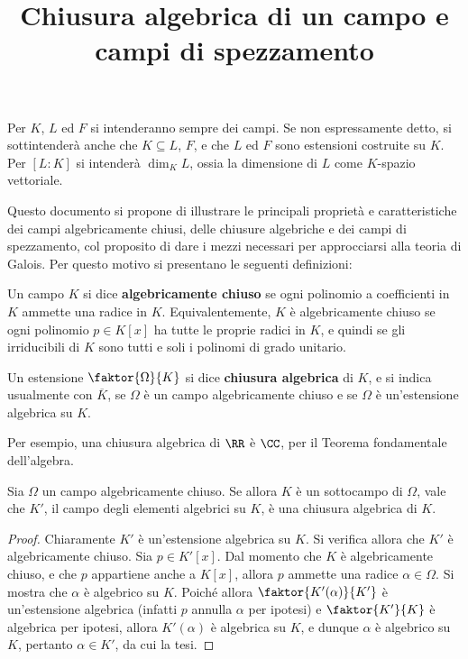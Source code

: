\documentclass[12pt]{scrartcl}
\begin{document}
	\title{Chiusura algebrica di un campo e campi di spezzamento}
	\maketitle
	
	\begin{note}
		Per $K$, $L$ ed $F$ si intenderanno sempre dei campi.
		Se non espressamente detto, si sottintenderà anche
		che $K \subseteq L$, $F$, e che $L$ ed $F$ sono
		estensioni costruite su $K$. Per $[L : K]$ si
		intenderà $\dim_K L$, ossia la dimensione di $L$
		come $K$-spazio vettoriale.
	\end{note} \bigskip


	Questo documento si propone di illustrare le principali
	proprietà e caratteristiche dei campi algebricamente
	chiusi, delle chiusure algebriche e dei campi di
	spezzamento, col proposito di dare i mezzi necessari
	per approcciarsi alla teoria di Galois. Per questo
	motivo si presentano le seguenti definizioni:
	
	\begin{definition}
		Un campo $K$ si dice \textbf{algebricamente chiuso}
		se ogni polinomio a coefficienti in $K$ ammette una
		radice in $K$. Equivalentemente, $K$ è algebricamente
		chiuso se ogni polinomio $p \in K[x]$ ha tutte le proprie
		radici in $K$, e quindi se gli irriducibili di $K$ sono
		tutti e soli i polinomi di grado unitario.
	\end{definition}
	
	\begin{definition}
		Un estensione $\faktor{\Omega}{K}$ si dice
		\textbf{chiusura algebrica} di $K$, e si
		indica usualmente con $\overline{K}$, se $\Omega$
		è un campo algebricamente chiuso e se
		$\Omega$ è un'estensione algebrica su $K$.
	\end{definition}
	
	\begin{remark}
		Per esempio, una chiusura algebrica di $\RR$ è $\CC$,
		per il Teorema fondamentale dell'algebra.
	\end{remark}
	
	\begin{proposition}
		Sia $\Omega$ un campo algebricamente chiuso. Se allora
		$K$ è un sottocampo di $\Omega$, vale che
		$K'$, il campo degli elementi algebrici
		su $K$, è una chiusura algebrica di $K$.
	\end{proposition}
	
	\begin{proof}
		Chiaramente
		$K'$ è un'estensione algebrica su
		$K$. Si verifica allora che $K'$ è
		algebricamente chiuso. Sia $p \in K'[x]$.
		Dal momento che $K$ è algebricamente chiuso, e
		che $p$ appartiene anche a $K[x]$, allora
		$p$ ammette una radice $\alpha \in \Omega$. Si mostra che
		$\alpha$ è algebrico su $K$. Poiché allora
		$\faktor{K'(\alpha)}{K'}$ è
		un'estensione algebrica (infatti $p$ annulla $\alpha$
		per ipotesi) e $\faktor{K'}{K}$ è algebrica
		per ipotesi, allora $K'(\alpha)$ è algebrica
		su $K$, e dunque $\alpha$ è algebrico su $K$, pertanto
		$\alpha \in K'$, da cui la tesi.
	\end{proof}
	
\end{document}

